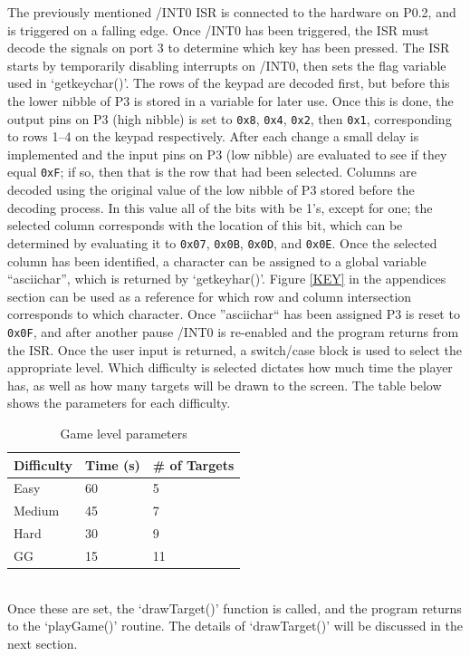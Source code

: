 \documentclass[12pt]{article}
\begin{document}
The previously mentioned /INT0 ISR is connected to the hardware on P0.2, and is triggered on a falling edge. Once /INT0 has been triggered, the ISR must decode the signals on port 3 to determine which key has been pressed. The ISR starts by temporarily disabling interrupts on /INT0, then sets the flag variable used in `getkeychar()'. The rows of the keypad are decoded first, but before this the lower nibble of P3 is stored in a variable for later use. Once this is done, the output pins on P3 (high nibble) is set to \texttt{0x8}, \texttt{0x4}, \texttt{0x2}, then \texttt{0x1}, corresponding to rows 1--4 on the keypad respectively. After each change a small delay is implemented and the input pins on P3 (low nibble) are evaluated to see if they equal \texttt{0xF}; if so, then that is the row that had been selected. Columns are decoded using the original value of the low nibble of P3 stored before the decoding process. In this value all of the bits with be 1's, except for one; the selected column corresponds with the location of this bit, which can be determined by evaluating it to \texttt{0x07}, \texttt{0x0B}, \texttt{0x0D}, and \texttt{0x0E}. Once the selected column has been identified, a character can be assigned to a global variable ``asciichar'', which is returned by `getkeyhar()'. Figure \ref{KEY} in the appendices section can be used as a reference for which row and column intersection corresponds to which character. Once ''asciichar`` has been assigned P3 is reset to \texttt{0x0F}, and after another pause /INT0 is re-enabled and the program returns from the ISR. Once the user input is returned, a switch/case block is used to select the appropriate level. Which difficulty is selected dictates how much time the player has, as well as how many targets will be drawn to the screen. The table below shows the parameters for each difficulty. \\
\begin{table}[h]
	\centering
	\begin{tabular}{|l|l|l|}
		\hline
		Difficulty & Time (s) & \# of Targets \\ \hline
		Easy       & 60       & 5             \\ \hline
		Medium     & 45   	  & 7             \\ \hline
		Hard       & 30   	  & 9             \\ \hline
		GG         & 15   	  & 11            \\ \hline
	\end{tabular}
	\caption{Game level parameters}
	\label{difficulty}
\end{table}\\
Once these are set, the `drawTarget()' function is called, and the program returns to the `playGame()' routine. The details of `drawTarget()' will be discussed in the next section. 
\end{document}
